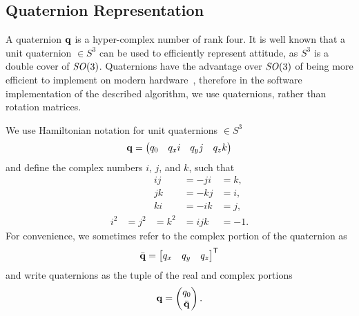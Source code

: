 
\subsection{Quaternion Representation}
\label{appx:quaternions}
A quaternion $\boldsymbol{\mathrm{q}}$ is a hyper-complex number of rank four.  It is well known that
a unit quaternion $\in S^3$ can be used to efficiently represent attitude, as
$S^3$ is a double cover of $\mathit{SO}(3)$.  Quaternions have the advantage over
$\mathit{SO}(3)$ of being more efficient to implement on modern hardware~\cite{casey2013AttitudeRepresentation}, therefore in the software implementation of the described algorithm, we use quaternions, rather than rotation matrices.

We use Hamiltonian notation for unit quaternions $\in S^3$
\begin{equation}
\q=\begin{pmatrix}q_{0} & q_{x}i & q_{y} j & q_{z}k \end{pmatrix}%
\end{equation}
and define the complex numbers $i$, $j$, and $k$, such that
\begin{equation}
\begin{array}{rrrcc}
	& & ij &= -ji &= k, \\
	& & jk &= -kj &= i, \\
	& & ki &= -ik &= j, \\
	i^2 &= j^2 &= k^2 & = ijk &= -1.
\end{array}
\end{equation}
For convenience, we sometimes refer to the complex portion of the quaternion as
\begin{equation}
	\bar{\boldsymbol{\mathrm{q}}} = \begin{bmatrix} q_x & q_y & q_z \end{bmatrix} ^{\mathsf{T}}
\end{equation}
and write quaternions as the tuple of the real and complex portions
\begin{equation}
	\boldsymbol{\mathrm{q}} = \begin{pmatrix} q_0 \\ \bar{\boldsymbol{\mathrm{q}}} \end{pmatrix}.
\end{equation}

